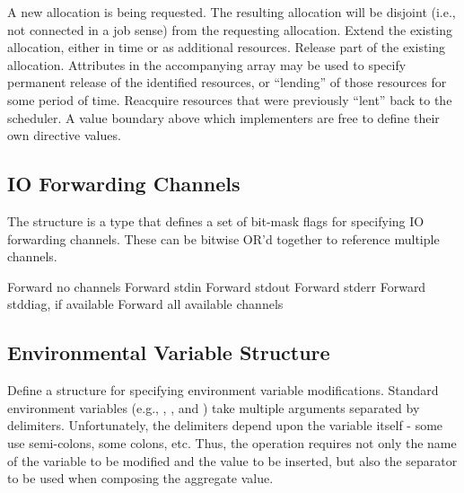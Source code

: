 \begin{constantdesc}
%
A new allocation is being requested.
The resulting allocation will be disjoint (i.e., not connected in a job sense) from the requesting allocation.
%
Extend the existing allocation, either in time or as additional resources.
%
Release part of the existing allocation.
Attributes in the accompanying  array may be used to specify permanent release of the identified resources, or ``lending'' of those resources for some period of time.
%
Reacquire resources that were previously ``lent'' back to the scheduler.
%
A value boundary above which implementers are free to define their own directive values.
%
\end{constantdesc}


\subsection{IO Forwarding Channels}

The  structure is a  type that defines a set of bit-mask flags for specifying IO forwarding channels. These can be bitwise OR'd together to reference multiple channels.

\begin{constantdesc}
%
Forward no channels
%
Forward stdin
%
Forward stdout
%
Forward stderr
%
Forward stddiag, if available
%
Forward all available channels
%
\end{constantdesc}


\subsection{Environmental Variable Structure}

Define a structure for specifying environment variable modifications.
Standard environment variables (e.g., , , and )
take multiple arguments separated by delimiters. Unfortunately, the delimiters
depend upon the variable itself - some use semi-colons, some colons, etc. Thus,
the operation requires not only the name of the variable to be modified and
the value to be inserted, but also the separator to be used when composing
the aggregate value.

